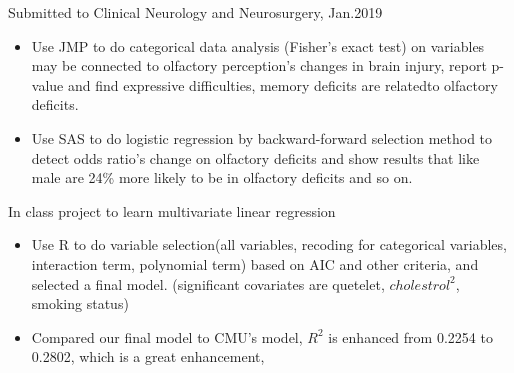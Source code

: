 \documentclass{resume}
\begin{document}
Submitted to Clinical Neurology and Neurosurgery, Jan.2019
\begin{itemize}
   \item Use JMP to do categorical data analysis (Fisher's exact test) on variables may be connected to olfactory perception's changes in brain injury, report p-value and find expressive difficulties, memory deficits are relatedto olfactory deficits.
  \item Use SAS to do logistic regression by backward-forward selection method to detect odds ratio's change on olfactory deficits and show results that like male are 24\% more likely to be in olfactory deficits and so on.
\end{itemize}

In class project to learn multivariate linear regression
\begin{itemize}
\item Use R to do variable selection(all variables, recoding for categorical variables, interaction term, polynomial term) based on AIC and other criteria, and selected a final model. (significant covariates are quetelet, $cholestrol^{2}$, smoking status)
  \item Compared our final model to CMU's model, $R^{2}$ is enhanced from 0.2254 to 0.2802, which is a great enhancement,
\end{itemize}



%
%
\end{document}
